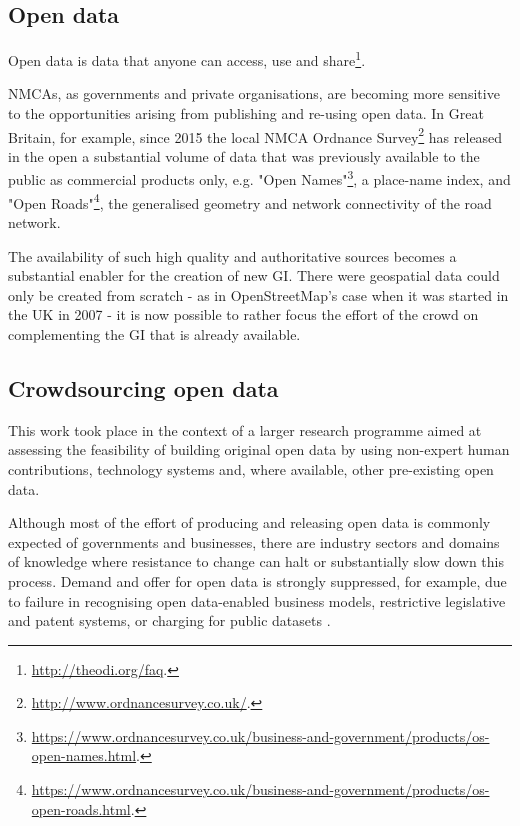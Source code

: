 \documentclass{llncs}
\begin{document}
\subsection{Open data}

    Open data is data that anyone can access, use and share\footnote{\url{http://theodi.org/faq}.}. 
    
    NMCAs, as governments and private organisations, are becoming more sensitive to the opportunities arising from publishing and re-using open data. In Great Britain, for example, since 2015 the local NMCA Ordnance Survey\footnote{\url{http://www.ordnancesurvey.co.uk/}.} has released in the open a substantial volume of data that was previously available to the public as commercial products only, e.g. "Open Names"\footnote{\url{https://www.ordnancesurvey.co.uk/business-and-government/products/os-open-names.html}.}, a place-name index, and "Open Roads"\footnote{\url{https://www.ordnancesurvey.co.uk/business-and-government/products/os-open-roads.html}.}, the generalised geometry and network connectivity of the road network.
    
    The availability of such high quality and authoritative sources becomes a substantial enabler for the creation of new GI. There were geospatial data could only be created from scratch - as in OpenStreetMap's case when it was started in the UK in 2007 - it is now possible to rather focus the effort of the crowd on complementing the GI that is already available.

\subsection{Crowdsourcing open data}

    This work took place in the context of a larger research programme aimed at assessing the feasibility of building original open data by using non-expert human contributions, technology systems and, where available, other pre-existing open data. 
    
    Although most of the effort of producing and releasing open data is commonly expected of governments and businesses, there are industry sectors and domains of knowledge where resistance to change can halt or substantially slow down this process. Demand and offer for open data is strongly suppressed, for example, due to failure in recognising open data-enabled business models, restrictive legislative and patent systems, or charging for public datasets \cite{shadboltpaf}. 
    
\end{document}

